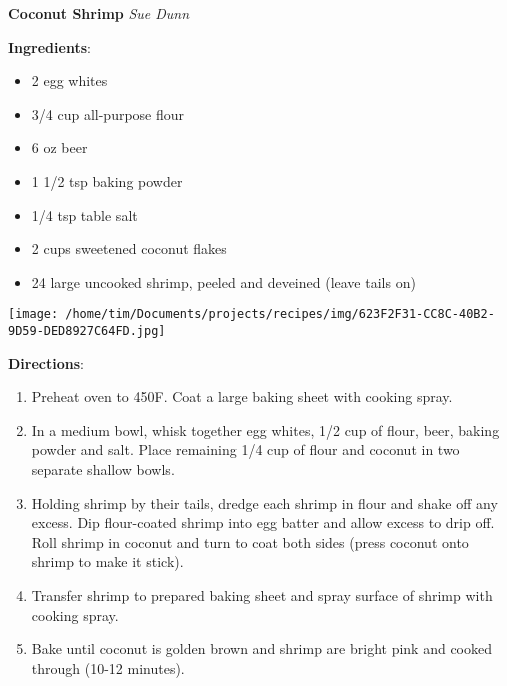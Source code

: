 \documentclass[11pt, twoside, openany]{book}
\begin{document}
\noindent\begin{minipage}[t]{\linewidth}%
{\Large\textbf{Coconut Shrimp}} \label{coconut-shrimp}\hfill\textit{Sue Dunn}\\
\noindent\begin{minipage}[t]{0.78\linewidth}%
\textbf{Ingredients}:\vspace{-3mm}
\begin{multicols}{2}
\begin{itemize}\setlength\itemsep{-1mm}
\item 2 egg whites
\item 3/4 cup all-purpose flour
\item 6 oz beer
\item 1 1/2 tsp baking powder
\item 1/4 tsp table salt
\item 2 cups sweetened coconut flakes
\item 24 large uncooked shrimp, peeled and deveined (leave tails on)
\end{itemize}
\end{multicols}
\end{minipage}
\noindent\begin{minipage}[t]{0.18\linewidth}
\centering \strut\vspace*{-\baselineskip}\newline
\texttt{[image: /home/tim/Documents/projects/recipes/img/623F2F31-CC8C-40B2-9D59-DED8927C64FD.jpg]}\\
\end{minipage}\vspace{3mm}
\textbf{Directions}:
\vspace{-3mm}\begin{enumerate}\setlength\itemsep{-1mm}
\item Preheat oven to 450F. Coat a large baking sheet with cooking spray.
\item In a medium bowl, whisk together egg whites, 1/2 cup of flour, beer, baking powder and salt. Place remaining 1/4 cup of flour and coconut in two separate shallow bowls.
\item Holding shrimp by their tails, dredge each shrimp in flour and shake off any excess. Dip flour-coated shrimp into egg batter and allow excess to drip off. Roll shrimp in coconut and turn to coat both sides (press coconut onto shrimp to make it stick).
\item Transfer shrimp to prepared baking sheet and spray surface of shrimp with cooking spray.
\item Bake until coconut is golden brown and shrimp are bright pink and cooked through (10-12 minutes).
\end{enumerate}
\end{minipage}\vspace{8mm}
\end{document}
